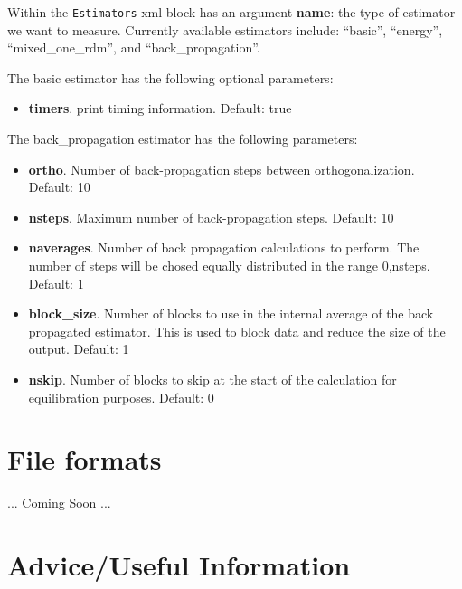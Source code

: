 Within the \texttt{Estimators} xml block has an argument \textbf{name}: the type of estimator we want to measure. Currently available estimators include: ``basic'', ``energy'', ``mixed\_one\_rdm'', and ``back\_propagation''.  

The basic estimator has the following optional parameters:
\begin{itemize}
\item \textbf{timers}. print timing information. Default: true
\end{itemize}

The back\_propagation estimator has the following parameters:
\begin{itemize}
\item \textbf{ortho}. Number of back-propagation steps between orthogonalization. 
    Default: 10
\item \textbf{nsteps}. Maximum number of back-propagation steps. 
    Default: 10
\item \textbf{naverages}. Number of back propagation calculations to perform. The number of steps will be chosed equally distributed in the range {0,nsteps}. 
    Default: 1
\item \textbf{block\_size}. Number of blocks to use in the internal average of the back propagated estimator. This is used to block data and reduce the size of the output. 
    Default: 1 
\item \textbf{nskip}. Number of blocks to skip at the start of the calculation for equilibration purposes. 
    Default: 0
\end{itemize}

\section{File formats}
... Coming Soon ...

\section{Advice/Useful Information}

